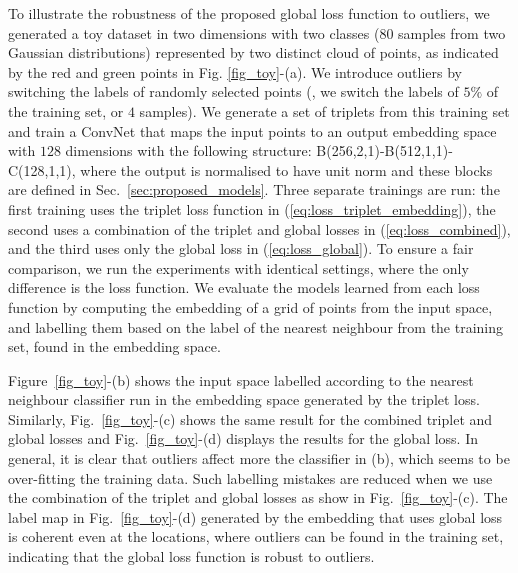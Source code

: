 \documentclass[10pt,twocolumn,letterpaper]{article}
\begin{document}
To illustrate the robustness of the proposed global loss function to outliers, we generated a toy dataset in two dimensions with two classes (80 samples from two Gaussian distributions) represented by two distinct cloud of points, as indicated by the red and green points in Fig. \ref{fig_toy}-(a). We introduce outliers
by switching the labels of randomly selected points (\ie, we switch the labels of $5\%$ of the training set, or $4$ samples). We generate a set of triplets from this training set and train a ConvNet that maps the input points to an output embedding space with $128$ dimensions with the following structure: B(256,2,1)-B(512,1,1)-C(128,1,1), where the output is normalised to have unit norm and these blocks are defined in Sec.~\ref{sec:proposed_models}.
Three separate trainings are run: the first training uses the triplet loss function in (\ref{eq:loss_triplet_embedding}), the second uses a combination of the triplet and global losses in (\ref{eq:loss_combined}), and the third uses only the global loss in (\ref{eq:loss_global}). To ensure a fair comparison, we run the experiments with identical settings, where the only difference is the loss function.
We evaluate the models learned from each loss function by computing the embedding of a grid of points from the input space, and labelling them based on the label of the nearest neighbour from the training set, found in the embedding space.

Figure~\ref{fig_toy}-(b) shows the input space labelled according to the nearest neighbour classifier run in the embedding space generated by the triplet loss.  Similarly, Fig.~\ref{fig_toy}-(c) shows the same result for the combined triplet and global losses and Fig.~\ref{fig_toy}-(d) displays the results for the global loss.
In general, it is clear that outliers affect more the classifier in (b), which seems to be over-fitting the training data.
Such labelling mistakes are reduced when we use the combination of the triplet and global losses as show in Fig.~\ref{fig_toy}-(c). The label map in Fig.~\ref{fig_toy}-(d) generated by the embedding that uses global loss is coherent
even at the locations, where outliers can be found in the training set, indicating that the global loss function is robust to outliers.
\end{document}
